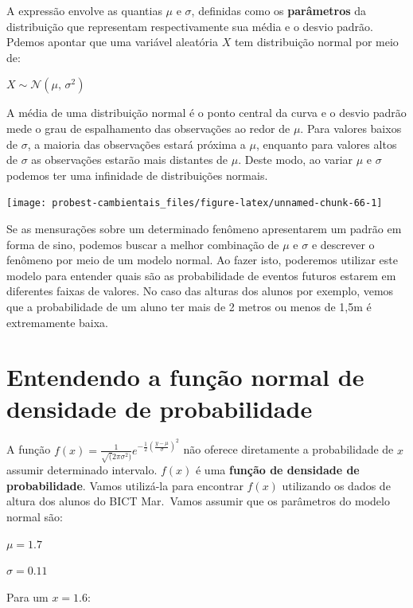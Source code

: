 \documentclass[
]{book}
\begin{document}
A expressão envolve as quantias \(\mu\) e \(\sigma\), definidas como os \textbf{parâmetros} da distribuição que representam respectivamente sua média e o desvio padrão. Pdemos apontar que uma variável aleatória \(X\) tem distribuição normal por meio de:

\(X \sim \mathcal{N}(\mu,\,\sigma^2)\)

A média de uma distribuição normal é o ponto central da curva e o desvio padrão mede o grau de espalhamento das observações ao redor de \(\mu\). Para valores baixos de \(\sigma\), a maioria das observações estará próxima a \(\mu\), enquanto para valores altos de \(\sigma\) as observações estarão mais distantes de \(\mu\). Deste modo, ao variar \(\mu\) e \(\sigma\) podemos ter uma infinidade de distribuições normais.

\begin{center}\texttt{[image: probest-cambientais\_files/figure-latex/unnamed-chunk-66-1]} \end{center}

Se as mensurações sobre um determinado fenômeno apresentarem um padrão em forma de sino, podemos buscar a melhor combinação de \(\mu\) e \(\sigma\) e descrever o fenômeno por meio de um modelo normal. Ao fazer isto, poderemos utilizar este modelo para entender quais são as probabilidade de eventos futuros estarem em diferentes faixas de valores. No caso das alturas dos alunos por exemplo, vemos que a probabilidade de um aluno ter mais de 2 metros ou menos de 1,5m é extremamente baixa.

\hypertarget{entendendo-a-funuxe7uxe3o-normal-de-densidade-de-probabilidade}{%
\section{Entendendo a função normal de densidade de probabilidade}\label{entendendo-a-funuxe7uxe3o-normal-de-densidade-de-probabilidade}}

A função \(f(x) = \frac{1}{\sqrt(2\pi\sigma^2)}e^{-\frac{1}{2}(\frac{y-\mu}{\sigma})^2}\) não oferece diretamente a probabilidade de \(x\) assumir determinado intervalo. \(f(x)\) é uma \textbf{função de densidade de probabilidade}. Vamos utilizá-la para encontrar \(f(x)\) utilizando os dados de altura dos alunos do BICT Mar.~Vamos assumir que os parâmetros do modelo normal são:

\(\mu = 1.7\)

\(\sigma = 0.11\)

Para um \(x = 1.6\):
\end{document}
